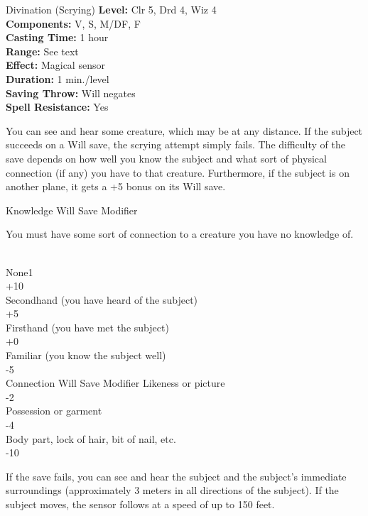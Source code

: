 {Divination (Scrying)}
{
	\textbf{Level:}
	Clr 5, Drd 4, Wiz 4\\
	\textbf{Components:}
	V, S, M/DF, F\\
	\textbf{Casting Time:}
	1 hour\\
	\textbf{Range:}
	See text\\
	\textbf{Effect:}
	Magical sensor\\
	\textbf{Duration:}
	1 min./level\\
	\textbf{Saving Throw:}
	Will negates\\
	\textbf{Spell Resistance:}
	Yes\\
}
{
	You can see and hear some creature, which may be at any distance. If the subject succeeds on a Will save, the scrying attempt simply fails. The difficulty of the save depends on how well you know the subject and what sort of physical connection (if any) you have to that creature. Furthermore, if the subject is on another plane, it gets a +5 bonus on its Will save.

{

Knowledge
Will Save Modifier




You must have some sort of connection to a creature you have no knowledge of.

	\\


	None1\\
	+10\\
	Secondhand (you have heard of the subject)\\
	+5\\
	Firsthand (you have met the subject)\\
	+0\\
	Familiar (you know the subject well)\\
	-5\\
Connection
Will Save Modifier
	Likeness or picture\\
	-2\\
	Possession or garment\\
	-4\\
	Body part, lock of hair, bit of nail, etc.\\
	-10\\

}
{
	If the save fails, you can see and hear the subject and the subject's immediate surroundings (approximately 3 meters in all directions of the subject). If the subject moves, the sensor follows at a speed of up to 150 feet.

}}
